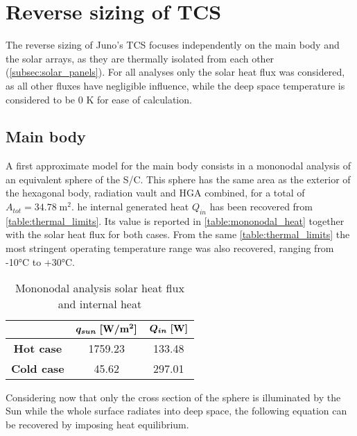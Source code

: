 \section{Reverse sizing of TCS}
\label{sec:TCS_sizing}

The reverse sizing of Juno's TCS focuses independently on the main body and the solar arrays, as they are thermally isolated from each other (\autoref{subsec:solar_panels}). For all analyses only the solar heat flux was considered, as all other fluxes have negligible influence, while the deep space temperature is considered to be 0 K for ease of calculation.

\subsection{Main body}
\label{subsec:mb_mono_sizing}

A first approximate model for the main body consists in a mononodal analysis of an equivalent sphere of the S/C. This sphere has the same area as the exterior of the hexagonal body, radiation vault and HGA combined, for a total of $A_{tot} = 34.78 \; \textrm{m}^2$. he internal generated heat $Q_{in}$ has been recovered from \autoref{table:thermal_limits}. Its value is reported in \autoref{table:mononodal_heat} together with the solar heat flux for both cases. From the same \autoref{table:thermal_limits} the most stringent operating temperature range was also recovered, ranging from -10°C to +30°C. 
\begin{table}[H]
    \renewcommand{\arraystretch}{1.3}
    \centering
    \begin{tabular}{|c|c|c|}
        \hline
        & $\boldsymbol{q_{sun} \; [\textrm{\textbf{W}}/\textrm{\textbf{m}}^2]}$ & $\boldsymbol{Q_{in} \; [\textrm{\textbf{W}}]}$ \\
        \hline
        \hline
        \textbf{Hot case} & 1759.23 & 133.48 \\
        \hline
        \textbf{Cold case} & 45.62 & 297.01 \\ 
        \hline
    \end{tabular}
    \caption{Mononodal analysis solar heat flux and internal heat}
    \label{table:mononodal_heat}
\end{table}

Considering now that only the cross section of the sphere is illuminated by the Sun while the whole surface radiates into deep space, the following equation can be recovered by imposing heat equilibrium.

